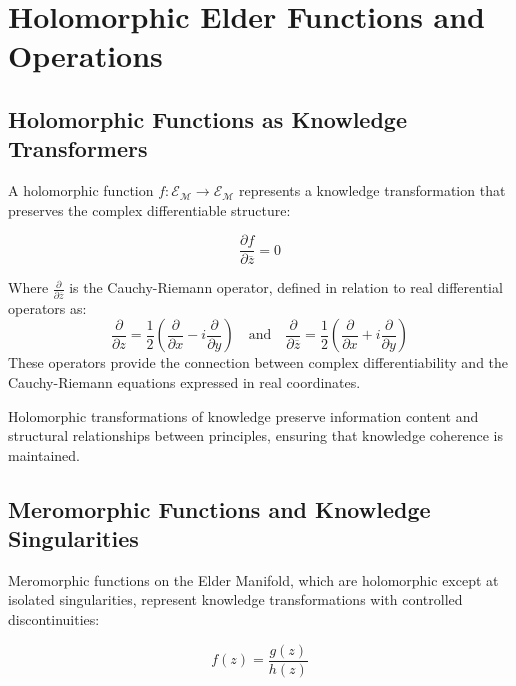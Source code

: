 \section{Holomorphic Elder Functions and Operations}

\subsection{Holomorphic Functions as Knowledge Transformers}

A holomorphic function $f: \mathcal{E}_{\mathcal{M}} \rightarrow \mathcal{E}_{\mathcal{M}}$ represents a knowledge transformation that preserves the complex differentiable structure:

\begin{equation}
\frac{\partial f}{\partial \overline{z}} = 0
\end{equation}

Where $\frac{\partial}{\partial \overline{z}}$ is the Cauchy-Riemann operator, defined in relation to real differential operators as:
\begin{equation}
\frac{\partial}{\partial z} = \frac{1}{2}\left(\frac{\partial}{\partial x} - i\frac{\partial}{\partial y}\right) \quad \text{and} \quad \frac{\partial}{\partial \overline{z}} = \frac{1}{2}\left(\frac{\partial}{\partial x} + i\frac{\partial}{\partial y}\right)
\end{equation}
These operators provide the connection between complex differentiability and the Cauchy-Riemann equations expressed in real coordinates.

\begin{theorem}
Holomorphic transformations of knowledge preserve information content and structural relationships between principles, ensuring that knowledge coherence is maintained.
\end{theorem}

\subsection{Meromorphic Functions and Knowledge Singularities}

Meromorphic functions on the Elder Manifold, which are holomorphic except at isolated singularities, represent knowledge transformations with controlled discontinuities:

\begin{equation}
f(z) = \frac{g(z)}{h(z)}
\end{equation}

